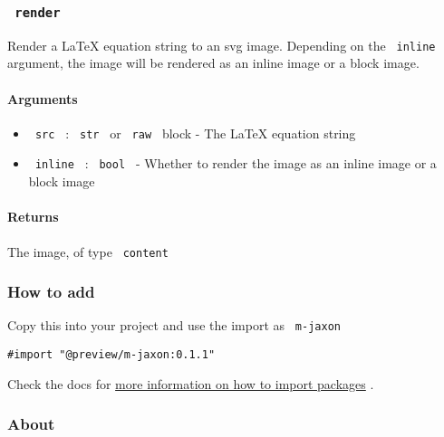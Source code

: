 \subsubsection{\texorpdfstring{\texttt{\ render\ }}{ render }}\label{render}

Render a LaTeX equation string to an svg image. Depending on the
\texttt{\ inline\ } argument, the image will be rendered as an inline
image or a block image.

\paragraph{Arguments}\label{arguments}

\begin{itemize}
\tightlist
\item
  \texttt{\ src\ } : \texttt{\ str\ } or \texttt{\ raw\ } block - The
  LaTeX equation string
\item
  \texttt{\ inline\ } : \texttt{\ bool\ } - Whether to render the image
  as an inline image or a block image
\end{itemize}

\paragraph{Returns}\label{returns}

The image, of type \texttt{\ content\ }

\subsubsection{How to add}\label{how-to-add}

Copy this into your project and use the import as \texttt{\ m-jaxon\ }

\begin{verbatim}
#import "@preview/m-jaxon:0.1.1"
\end{verbatim}



Check the docs for
\href{https://typst.app/docs/reference/scripting/\#packages}{more
information on how to import packages} .

\subsubsection{About}\label{about}

